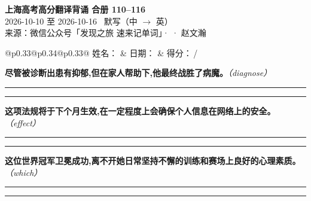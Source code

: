 \documentclass[11pt,a4paper]{article}
\newcommand{\num}[1]{\makebox[1.9em][r]{#1.}\hspace{0.3em}}
\newcommand{\wline}{\noindent\rule{\linewidth}{0.4pt}}
\newcommand{\prompt}[1]{\emph{\textcolor{tipblue}{\small（#1）}}}
\begin{document}
\pagestyle{plain}
\begin{center}
{\LARGE\bfseries 上海高考高分翻译背诵 \quad 合册 110–116}\\[0.25em]
{\large 2026-10-10 至 2026-10-16 \quad\ 默写（中 $\to$ 英）}\\[0.35em]
{\footnotesize 来源：微信公众号「发现之旅 速来记单词」·  · 赵文瀚}
\end{center}

\vspace{0.4em}
\noindent\begin{tabular}{@{}p{0.33\textwidth}@{}p{0.34\textwidth}@{}p{0.33\textwidth}@{}}
姓名：\underline{\hspace{2.0cm}} & 日期：\underline{\hspace{2.0cm}} & 得分：\underline{\hspace{1.4cm}}\,/ \\
\end{tabular}

\vspace{0.5em}

\vspace{0.8em}
\vspace{0.35em}\vspace{0.15em}

\begin{minipage}{\linewidth}

\num{1}\textbf{尽管被诊断出患有抑郁,但在家人帮助下,他最终战胜了病魔。}\prompt{diagnose}

\vspace{0.3em}

\wline\vspace{0.3em}
\wline

\end{minipage}

\begin{minipage}{\linewidth}

\num{2}\textbf{这项法规将于下个月生效,在一定程度上会确保个人信息在网络上的安全。}\prompt{effect}

\vspace{0.3em}

\wline\vspace{0.3em}
\wline

\end{minipage}

\begin{minipage}{\linewidth}

\num{3}\textbf{这位世界冠军卫冕成功,离不开她日常坚持不懈的训练和赛场上良好的心理素质。}\prompt{which}

\vspace{0.3em}

\wline\vspace{0.3em}
\wline

\end{minipage}
\end{document}
